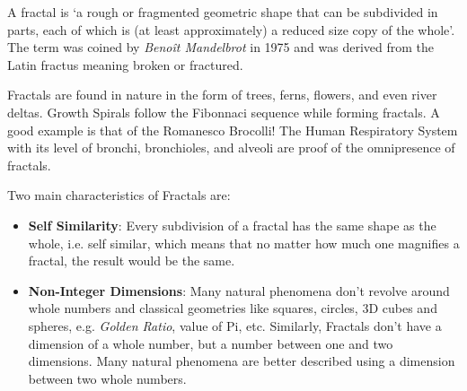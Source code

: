 \documentclass{resonance}
\begin{document}
	
A fractal is ‘a rough or fragmented geometric shape that can be subdivided in parts, each of which is (at least approximately) a reduced size copy of the whole’. The term was coined by \textit{Benoît Mandelbrot} in 1975 and was derived from the Latin fractus meaning broken or fractured.

Fractals are found in nature in the form of trees, ferns, flowers, and even river deltas. Growth Spirals follow the Fibonnaci sequence while forming fractals. A good example is that of the Romanesco Brocolli! The Human Respiratory System with its level of bronchi, bronchioles, and alveoli are proof of the omnipresence of fractals.

Two main characteristics of Fractals are:
\begin{itemize}
    \item \textbf{Self Similarity}: Every subdivision of a fractal has the same shape as the whole, i.e. self similar, which means that no matter how much one magnifies a fractal, the result would be the same.
    

    \item \textbf{Non-Integer Dimensions}: Many natural phenomena don’t revolve around whole numbers and classical geometries like squares, circles, 3D cubes and spheres, e.g. \textit{Golden Ratio}, value of Pi, etc. Similarly, Fractals don’t have a dimension of a whole number, but a number between one and two dimensions. Many natural phenomena are better described using a dimension between two whole numbers.
\end{itemize}
\end{document}
